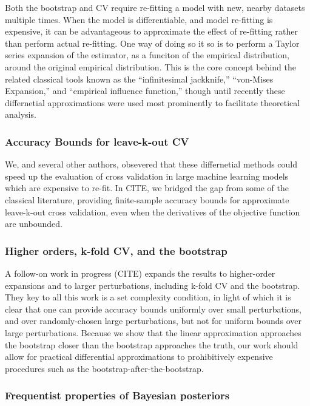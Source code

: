 Both the bootstrap and CV require re-fitting a model with new, nearby datasets
multiple times.  When the model is differentiable, and model re-fitting is
expensive, it can be advantageous to approximate the effect of re-fitting rather
than perform actual re-fitting.  One way of doing so it so is to perform a
Taylor series expansion of the estimator, as a funciton of the empirical
distribution, around the original empirical distribution.  This is the core
concept behind the related classical tools known as the ``infinitesimal
jackknife,'' ``von-Mises Expansion,'' and ``empirical influence function,''
though until recently these differnetial approximations were used most
prominently to facilitate theoretical analysis.


\subsubsection*{Accuracy Bounds for leave-k-out CV}

We, and several other authors, obsevered that these differnetial methods
could speed up the evaluation of cross validation in large machine learning
models which are expensive to re-fit.  In CITE, we bridged the gap from
some of the classical literature, providing finite-sample accuracy bounds
for approximate leave-k-out cross validation, even when the derivatives of
the objective function are unbounded.


\subsubsection*{Higher orders, k-fold CV, and the bootstrap}

A follow-on work in progress (CITE) expands the results to higher-order
expansions and to larger perturbations, including k-fold CV and the bootstrap.
They key to all this work is a set complexity condition, in light of which it is
clear that one can provide accuracy bounds uniformly over small perturbations,
and over randomly-chosen large perturbations, but not for uniform bounds over
large perturbations.  Because we show that the linear approximation approaches
the bootstrap closer than the bootstrap approaches the truth, our work
should allow for practical differential approximations to prohibitively
expensive procedures such as the bootstrap-after-the-bootstrap.


\subsubsection*{Frequentist properties of Bayesian posteriors}

